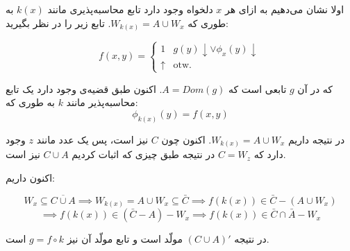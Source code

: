 اولا نشان می‌دهیم به ازای هر $x$ دلخواه وجود دارد تابع محاسبه‌پذیری مانند $k(x)$
به طوری که $W_{k(x)} = A \cup W_x$. تابع زیر را در نظر بگیرید:

$$
f(x,y) = \begin{cases}
    1 & g(y)\downarrow \vee \phi_x(y) \downarrow \\ 
    \uparrow & \text{otw.}
\end{cases}
$$

که در آن $g$ تابعی است که $A=Dom(g)$.
اکنون طبق قضیه‌ی  وجود دارد یک تابع محاسبه‌پذیر مانند $k$ به طوری که:
$$\phi_{k(x)}(y) = f(x,y)$$

در نتیجه داریم $W_{k(x)} = A \cup W_x$. اکنون چون $C$ نیز  است، پس یک عدد مانند $z$ وجود دارد که $C=W_z$ در نتیجه طبق چیزی که اثبات کردیم $C\cup A$ نیز  است.

اکنون داریم:

$$
W_x \subseteq \overline{C \cup A} \implies W_{k(x)} = A \cup W_x \subseteq \bar{C}
\implies f(k(x)) \in \bar{C} - (A\cup W_x)
$$
$$
\implies f(k(x)) \in (\bar{C} - A) - W_x \implies f(k(x)) \in \bar{C}\cap \bar{A} - W_x
$$

در نتیجه $(C\cup A)'$ مولّد است و تابع مولّد آن نیز $g = f \circ k$ است.